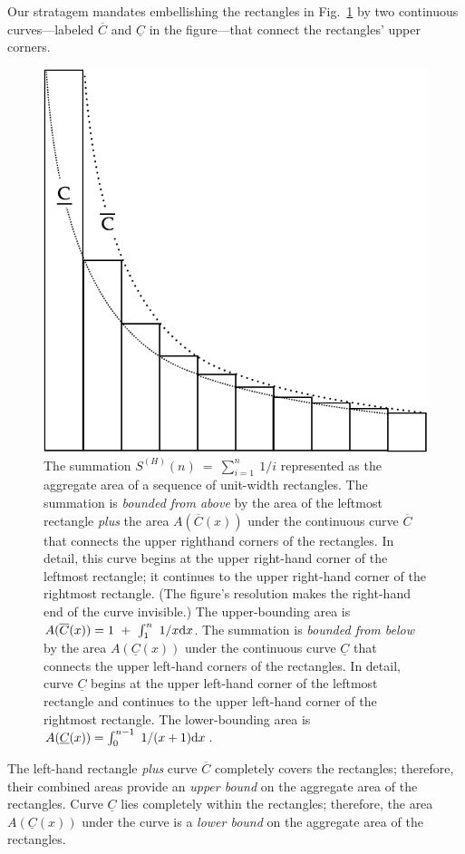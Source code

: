 \begin{enumerate}
Our stratagem mandates embellishing the rectangles in Fig.~\ref{fig:riemann-harmonic} by two continuous curves---labeled $\overline{C}$ and $\underline{C}$ in the figure---that connect the rectangles' upper corners.
\begin{figure}[htb]
\centerline{
\includegraphics[scale=0.3]{FiguresMaths/RiemannSum}
}
\caption{The summation $S^{(H)}(n) \ = \ \sum_{i=1}^n \ 1/i$ represented as the aggregate area of a sequence of unit-width rectangles.  The summation is {\em bounded from above} by the area of the leftmost rectangle {\em plus} the area $A(\overline{C}(x))$ under the continuous curve $\overline{C}$ that connects the upper righthand corners of the rectangles.  In detail, this curve begins at the upper right-hand corner of the leftmost rectangle; it continues to the upper right-hand corner of the rightmost rectangle.  (The figure's resolution makes the right-hand end of the curve invisible.)  The upper-bounding area is $A(\overline{C}(x)) = 1 \ + \ \int_1^n \ 1/x {\rm d}x$.  The summation is {\em bounded from below} by the area $A(\underline{C}(x))$ under the continuous curve $\underline{C}$ that connects the upper left-hand corners of the rectangles.  In detail, curve $\underline{C}$ begins at the upper left-hand corner of the leftmost rectangle and continues to the upper left-hand corner of the rightmost rectangle.  The lower-bounding area is $A(\underline{C}(x)) =  \int_0^{n-1} \ 1/(x+1) {\rm d}x$.} 
\label{fig:riemann-harmonic}
\end{figure}
The left-hand rectangle {\em plus} curve $\overline{C}$ completely covers the rectangles; therefore, their combined areas provide an {\em upper bound} on the aggregate area of the rectangles.  Curve $\underline{C}$ lies completely within the rectangles; therefore, the area $A(\underline{C}(x))$ under the curve is a {\em lower bound} on the aggregate area of the rectangles.
\end{enumerate}

